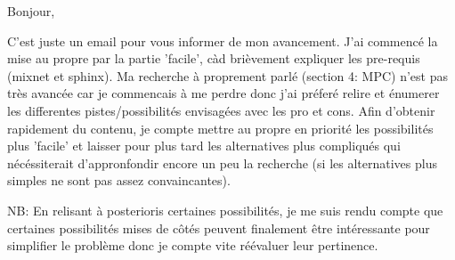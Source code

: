 



Bonjour,

C'est juste un email pour vous informer de mon avancement.
J'ai commencé la mise au propre par la partie 'facile', càd brièvement expliquer les pre-requis (mixnet et sphinx).
Ma recherche à proprement parlé (section 4: MPC) n'est pas très avancée car je commencais à me perdre donc j'ai préferé relire et énumerer les differentes pistes/possibilités envisagées avec les pro et cons.
Afin d'obtenir rapidement du contenu, je compte mettre au propre en priorité les possibilités plus 'facile' et laisser pour plus tard les alternatives plus compliqués qui nécéssiterait d'appronfondir encore un peu la recherche (si les alternatives plus simples ne sont pas assez convaincantes).

NB: En relisant à posterioris certaines possibilités, je me suis rendu compte que certaines possibilités mises de côtés peuvent finalement être intéressante pour simplifier le problème donc je compte vite réévaluer leur pertinence.